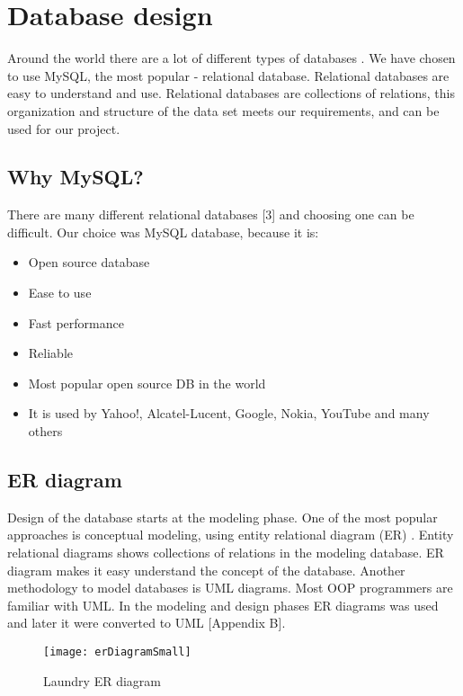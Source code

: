 %
\section{Database design}

Around the world there are a lot of different types of databases \cite{bib1}. We have chosen to use MySQL, the most popular - relational database. Relational databases are easy to understand \cite{bib2} and use. Relational databases are collections of relations, this organization and structure of the data set meets our requirements, and can be used for our project.

\subsection{Why MySQL?}

There are many different relational databases [3] and choosing one can be difficult. Our choice was MySQL database, because it is:

\begin{itemize}
	\item Open source database
	\item Ease to use
	\item Fast performance
	\item Reliable 
	\item Most popular open source DB in the world
	\item It is used by Yahoo!, Alcatel-Lucent, Google, Nokia, YouTube and many others
\end{itemize}

\subsection{ER diagram}

Design of the database starts at the modeling phase. One of the most popular approaches is conceptual modeling, using entity relational diagram (ER) \cite{bib4}. Entity relational diagrams shows collections of relations in the modeling database. ER diagram makes it easy understand the concept of the database. Another methodology to model databases is UML diagrams. Most OOP programmers are familiar with UML. In the modeling and design phases ER diagrams was used and later it were converted to UML [Appendix B].

\begin{figure}[h]
	\centering
		\texttt{[image: erDiagramSmall]}
	\caption{Laundry ER diagram}
	\label{fig:planning}
\end{figure}

